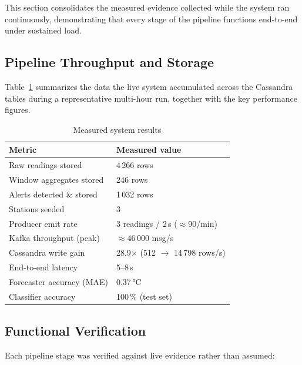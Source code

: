 \documentclass[conference,a4paper]{IEEEtran}
\begin{document}
This section consolidates the measured evidence collected while the system ran
continuously, demonstrating that every stage of the pipeline functions
end-to-end under sustained load.

\subsection{Pipeline Throughput and Storage}

Table~\ref{tab:results} summarizes the data the live system accumulated across
the Cassandra tables during a representative multi-hour run, together with
the key performance figures.

\begin{table}[H]
\centering
\caption{Measured system results}
\label{tab:results}
\renewcommand{\arraystretch}{1.15}
\begin{tabular}{ll}
\toprule
\textbf{Metric} & \textbf{Measured value} \\
\midrule
Raw readings stored        & 4\,266 rows \\
Window aggregates stored   & 246 rows \\
Alerts detected \& stored  & 1\,032 rows \\
Stations seeded            & 3 \\
Producer emit rate         & 3 readings / 2\,s ($\approx$90/min) \\
Kafka throughput (peak)    & $\approx$46\,000 msg/s \\
Cassandra write gain       & 28.9$\times$ (512 $\rightarrow$ 14\,798 rows/s) \\
End-to-end latency         & 5--8\,s \\
Forecaster accuracy (MAE)  & 0.37\,°C \\
Classifier accuracy        & 100\,\% (test set) \\
\bottomrule
\end{tabular}
\end{table}

\subsection{Functional Verification}

Each pipeline stage was verified against live evidence rather than assumed:
\end{document}
